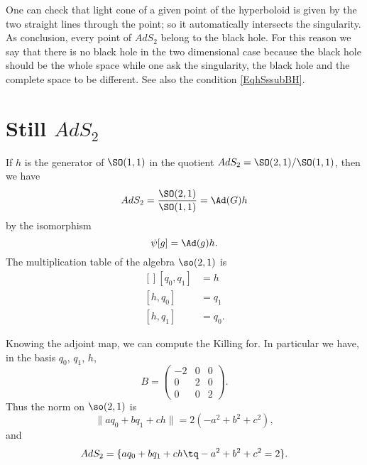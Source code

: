 One can check that light cone of a given point of the hyperboloid is given by the two straight lines through the point; so it automatically intersects the singularity. As conclusion, every point of $AdS_2$ belong to the black hole. For this reason we say that there is no black hole in the two dimensional case because the black hole should be the whole space while one ask the singularity, the black hole and the complete space to be different. See also the condition \eqref{EqhSssubBH}.

\section{Still \texorpdfstring{$AdS_2$}{AdS2}}

If $h$ is the generator of $\SO(1,1)$ in the quotient $AdS_2=\SO(2,1)/\SO(1,1)$, then we have
\begin{equation}
	AdS_2=\frac{ \SO(2,1) }{ \SO(1,1) }=\Ad(G)h
\end{equation}
by the isomorphism
\begin{equation}
	\psi[g]=\Ad(g)h.
\end{equation}
The multiplication table of the algebra $\so(2,1)$ is
\begin{equation}
	\begin{aligned}[]
		[q_0,q_1] & =h    \\
		[h,q_0]   & =q_1  \\
		[h,q_1]   & =q_0.
	\end{aligned}
\end{equation}

Knowing the adjoint map, we can compute the Killing for. In particular we have, in the basis $q_0$, $q_1$, $h$,
\begin{equation}
	B=\begin{pmatrix}
		-2 & 0 & 0 \\
		0  & 2 & 0 \\
		0  & 0 & 2
	\end{pmatrix}.
\end{equation}
Thus the norm on $\so(2,1)$ is
\begin{equation}
	\| aq_0+bq_1+ch\| =2(-a^2+b^2+c^2),
\end{equation}
and
\begin{equation}
	AdS_2=\{ aq_0+bq_1+ch\tq -a^2+b^2+c^2=2 \}.
\end{equation}

